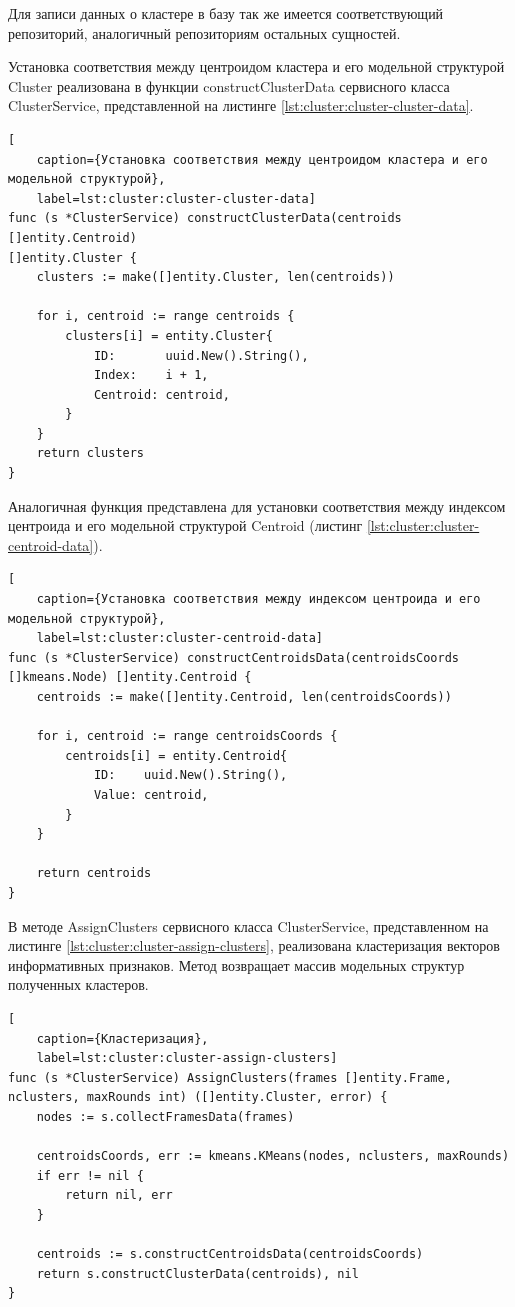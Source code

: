 Для записи данных о кластере в базу так же имеется соответствующий репозиторий, аналогичный репозиториям остальных сущностей. 

Установка соответствия между центроидом кластера и его модельной структурой Cluster реализована в функции constructClusterData сервисного класса ClusterService, представленной на листинге \ref{lst:cluster:cluster-cluster-data}.
\begin{lstlisting}[
	caption={Установка соответствия между центроидом кластера и его модельной структурой},
	label=lst:cluster:cluster-cluster-data]
func (s *ClusterService) constructClusterData(centroids []entity.Centroid) 
[]entity.Cluster {
	clusters := make([]entity.Cluster, len(centroids))
	
	for i, centroid := range centroids {
		clusters[i] = entity.Cluster{
			ID:       uuid.New().String(),
			Index:    i + 1,
			Centroid: centroid,
		}
	}
	return clusters
}
\end{lstlisting}
Аналогичная функция представлена для установки соответствия между индексом центроида и его модельной структурой Centroid (листинг \ref{lst:cluster:cluster-centroid-data}).
\begin{lstlisting}[
	caption={Установка соответствия между индексом центроида и его модельной структурой},
	label=lst:cluster:cluster-centroid-data]
func (s *ClusterService) constructCentroidsData(centroidsCoords
[]kmeans.Node) []entity.Centroid {
	centroids := make([]entity.Centroid, len(centroidsCoords))
	
	for i, centroid := range centroidsCoords {
		centroids[i] = entity.Centroid{
			ID:    uuid.New().String(),
			Value: centroid,
		}
	}
	
	return centroids
}
\end{lstlisting}
В методе AssignClusters сервисного класса ClusterService, представленном на листинге \ref{lst:cluster:cluster-assign-clusters}, реализована кластеризация векторов информативных признаков. Метод возвращает массив модельных структур полученных кластеров.
\begin{lstlisting}[
	caption={Кластеризация},
	label=lst:cluster:cluster-assign-clusters]
func (s *ClusterService) AssignClusters(frames []entity.Frame, 
nclusters, maxRounds int) ([]entity.Cluster, error) {
	nodes := s.collectFramesData(frames)
	
	centroidsCoords, err := kmeans.KMeans(nodes, nclusters, maxRounds)
	if err != nil {
		return nil, err
	}
	
	centroids := s.constructCentroidsData(centroidsCoords)
	return s.constructClusterData(centroids), nil
}
\end{lstlisting}

